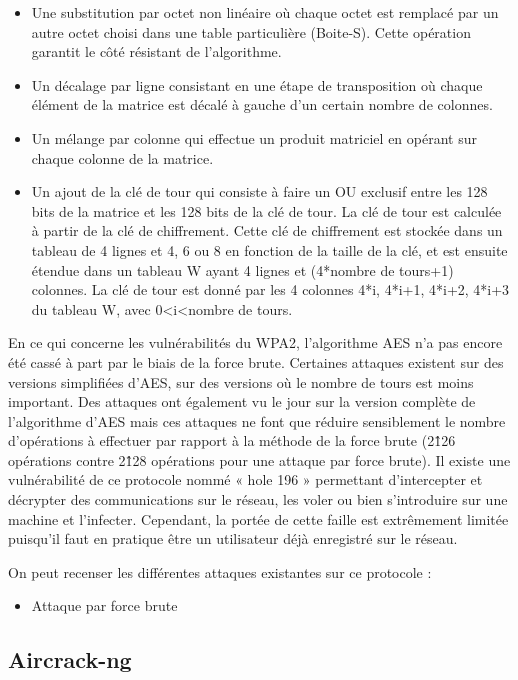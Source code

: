 \documentclass[11pt]{article}
\begin{document}
\begin{itemize}
\item 	Une substitution par octet non linéaire où chaque octet est remplacé par un autre octet choisi dans une table particulière (Boite-S). Cette opération garantit le côté résistant de l’algorithme.
\item 	Un décalage par ligne consistant en une étape de transposition où chaque élément de la matrice est décalé à gauche d’un certain nombre de colonnes.
\item 	Un mélange par colonne qui effectue un produit matriciel en opérant sur chaque colonne de la matrice.
\item  Un ajout de la clé de tour qui consiste à faire un OU exclusif entre les 128 bits de la matrice et les 128 bits de la clé de tour. La clé de tour est calculée à partir de la clé de chiffrement. Cette clé de chiffrement est stockée dans un tableau de 4 lignes et 4, 6 ou 8 en fonction de la taille de la clé, et est ensuite étendue dans un tableau W ayant 4 lignes et (4*nombre de tours+1) colonnes. La clé de tour est donné par les 4 colonnes 4*i, 4*i+1, 4*i+2, 4*i+3 du tableau W, avec 0<i<nombre de tours.
\end{itemize}

En ce qui concerne les vulnérabilités du WPA2, l’algorithme AES n’a pas encore été cassé à part par le biais de la force brute.
Certaines attaques existent sur des versions simplifiées d’AES, sur des versions où le nombre de tours est moins important.
Des attaques ont également vu le jour sur la version complète de l’algorithme d’AES mais ces attaques ne font que réduire sensiblement le nombre d’opérations à effectuer par rapport à la méthode de la force brute (2\^{126} opérations contre 2\^{128} opérations pour une attaque par force brute).
Il existe une vulnérabilité de ce protocole nommé « hole 196 » permettant d’intercepter et décrypter des communications sur le réseau, les voler ou bien s’introduire sur une machine et l’infecter. Cependant, la portée de cette faille est extrêmement limitée puisqu’il faut en pratique être un utilisateur déjà enregistré sur le réseau.

On peut recenser les différentes attaques existantes sur ce protocole :

\begin{itemize}
\item 	Attaque par force brute
\end{itemize}


\subsection{Aircrack-ng}
\newpage
\end{document}
